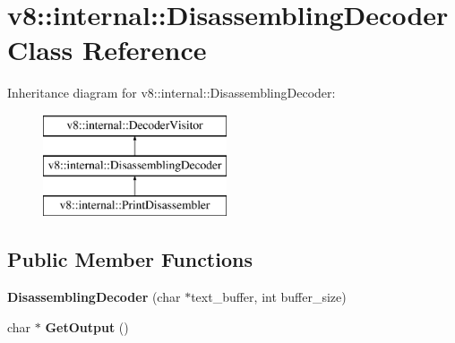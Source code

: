 \hypertarget{classv8_1_1internal_1_1_disassembling_decoder}{}\section{v8\+:\+:internal\+:\+:Disassembling\+Decoder Class Reference}
\label{classv8_1_1internal_1_1_disassembling_decoder}
Inheritance diagram for v8\+:\+:internal\+:\+:Disassembling\+Decoder\+:\begin{figure}[H]
\begin{center}
\leavevmode
\includegraphics[height=3.000000cm]{classv8_1_1internal_1_1_disassembling_decoder}
\end{center}
\end{figure}
\subsection*{Public Member Functions}
\begin{DoxyCompactItemize}
\item 
{\bfseries Disassembling\+Decoder} (char $\ast$text\+\_\+buffer, int buffer\+\_\+size)\hypertarget{classv8_1_1internal_1_1_disassembling_decoder_a0a46a9c311ed04da4116cf5d5871c779}{}\label{classv8_1_1internal_1_1_disassembling_decoder_a0a46a9c311ed04da4116cf5d5871c779}

\item 
char $\ast$ {\bfseries Get\+Output} ()\hypertarget{classv8_1_1internal_1_1_disassembling_decoder_a7606b6388a7f320bff8edec101cb0e79}{}\label{classv8_1_1internal_1_1_disassembling_decoder_a7606b6388a7f320bff8edec101cb0e79}

\end{DoxyCompactItemize}
